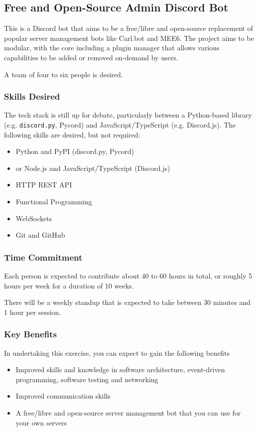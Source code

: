 \documentclass[../proposal-for-projects-2025.tex]{subfiles}
\begin{document}
\subsection{Free and Open-Source Admin Discord Bot}

This is a Discord bot that aims to be a free/libre and open-source replacement of popular server management bots like Carl.bot and MEE6.  The project aims to be modular, with the core including a plugin manager that allows various capabilities to be added or removed on-demand by users.

A team of four to six people is desired.

\subsubsection*{Skills Desired}

The tech stack is still up for debate, particularly between a Python-based library (e.g. \texttt{discord.py}, Pycord) and JavaScript/TypeScript (e.g. Discord.js).  The following skills are desired, but not required:

\begin{multicols}{2}
\begin{itemize}
    \item Python and PyPI (discord.py, Pycord)
    \item or Node.js and JavaScript/TypeScript (Discord.js)
    \item HTTP REST API
    \item Functional Programming
    \item WebSockets
    \item Git and GitHub
\end{itemize}
\end{multicols}

\subsubsection*{Time Commitment}

Each person is expected to contribute about 40 to 60 hours in total, or roughly 5 hours per week for a duration of 10 weeks.

There will be a weekly standup that is expected to take between 30 minutes and 1 hour per session.

\subsubsection*{Key Benefits}

In undertaking this exercise, you can expect to gain the following benefits

\begin{itemize}
    \item Improved skills and knowledge in software architecture, event-driven programming, software testing and networking
    \item Improved communication skills
    \item A free/libre and open-source server management bot that you can use for your own servers
\end{itemize}
\end{document}
